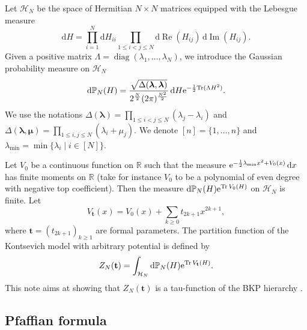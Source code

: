 \documentclass[pdftex]{sigma}
\numberwithin{equation}{section}
\newcommand{\dd}{\mathrm{d}}
\begin{document}
Let $\mathcal{H}_N$ be the space of Hermitian $N \times N$ matrices
equipped with the Lebesgue measure
\[
\dd H= \prod_{i=1}^N \dd H_{ii}
 \prod_{1 \leq i < j \leq N} \dd\operatorname{Re}(H_{ij})\, \dd\operatorname{Im}(H_{ij}).
\]
Given a positive matrix $\Lambda = \operatorname{diag}(\lambda_1,\dots,\lambda_N)$,
we introduce the Gaussian probability measure on $\mathcal{H}_N$
\begin{equation}
\label{theGauss}
\dd \mathbb{P}_N(H) = \frac{\sqrt{\Delta(\boldsymbol{\lambda},\boldsymbol{\lambda})}}{2^{\frac{N}{2}} (2\pi)^{\frac{N^2}{2}}}\,\dd H {\rm e}^{-\frac{1}{2}{\rm Tr}(\Lambda H^2)}.
\end{equation}
We use the notations $\Delta(\boldsymbol{\lambda}) = \prod_{1 \leq i < j \leq N} (\lambda_j - \lambda_i)$ and $\Delta(\boldsymbol{\lambda},\boldsymbol{\mu}) = \prod_{1 \leq i,j \leq N} (\lambda_i + \mu_j)$. We denote $[n] = \{1,\dots,n\}$ and $\lambda_{\min} = \min\{\lambda_i\mid i \in [N]\}$.

Let $V_0$ be a continuous function on $\mathbb{R}$ such that the measure ${\rm e}^{- \frac{1}{2}\lambda_{\min} x^2 + V_0(x)}\,\dd x$ has finite moments on $\mathbb{R}$ (take for instance $V_0$ to be a polynomial of even degree with negative top coefficient). Then the measure $\dd \mathbb{P}_N(H) {\rm e}^{ \operatorname{Tr}V_0(H)}$ on $\mathcal{H}_N$ is finite. Let
\[
V_{\mathbf{t}}(x) = V_0(x) + \sum_{k \geq 0} t_{2k + 1} x^{2k + 1},
\]
where $\mathbf{t} = (t_{2k + 1})_{k \geq 1}$ are formal parameters. The partition function of the Kontsevich model with arbitrary potential is defined by
\begin{equation}
\label{Zdef} Z_N(\mathbf{t}) = \int_{\mathcal{H}_N} \dd\mathbb{P}_N(H) {\rm e}^{\operatorname{Tr}V_{\mathbf{t}}(H)}.
\end{equation}
This note aims at showing that $Z_N(\mathbf{t})$ is a
tau-function of the BKP hierarchy \cite{Date:1981qz}.

\subsection{Pfaffian formula}
\end{document}

